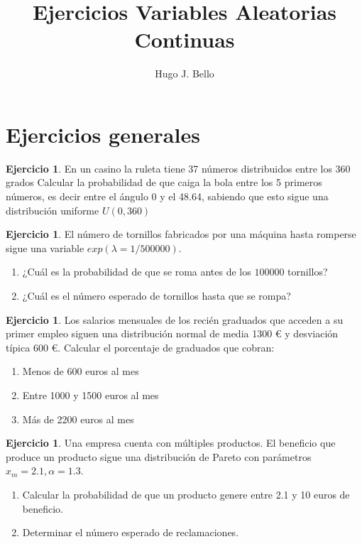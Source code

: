 \documentclass[]{article}
\title{Ejercicios Variables Aleatorias Continuas}
\author{Hugo J. Bello}
\date{}
\theoremstyle{plain}
\theoremstyle{definition}
\newtheorem{exercise}[theorem]{Ejercicio}
\theoremstyle{definition} %
\begin{document}
\maketitle
\section{Ejercicios generales}



\begin{exercise}
  En un casino la ruleta tiene  37 números distribuidos entre los 360 grados 
  Calcular la probabilidad de que caiga la bola entre los 5 primeros números, es decir entre el ángulo 0 y el  48.64, sabiendo que esto sigue una 
  distribución uniforme $U(0,360)$
  \end{exercise}



\begin{exercise}
  El número de tornillos fabricados por una máquina hasta romperse sigue una variable
  $exp(\lambda= 1/500 000)$. 
  \begin{enumerate}
    \item ¿Cuál es la probabilidad de que se roma antes de los $100000$ tornillos?
    \item ¿Cuál es el número esperado de tornillos hasta que se rompa?
  \end{enumerate}
\end{exercise}


\begin{exercise}
  Los salarios mensuales de los recién graduados que acceden a su primer empleo siguen una distribución normal de 
  media 1300 € y desviación típica 600 €. 
  Calcular el porcentaje de graduados que cobran:
  \begin{enumerate}
    \item Menos de 600 euros al mes
    \item Entre 1000 y 1500 euros al mes
    \item Más de 2200 euros al mes
  \end{enumerate}

\end{exercise}


\begin{exercise}
  Una empresa cuenta con múltiples productos. El beneficio que produce un producto sigue una distribución de Pareto 
  con parámetros $x_m = 2.1, \alpha = 1.3$. 
  \begin{enumerate}
    \item Calcular la probabilidad de que un producto genere entre 2.1 y 10 euros de beneficio.
    \item Determinar el número esperado de reclamaciones.
  \end{enumerate}


\end{exercise}
\end{document}
